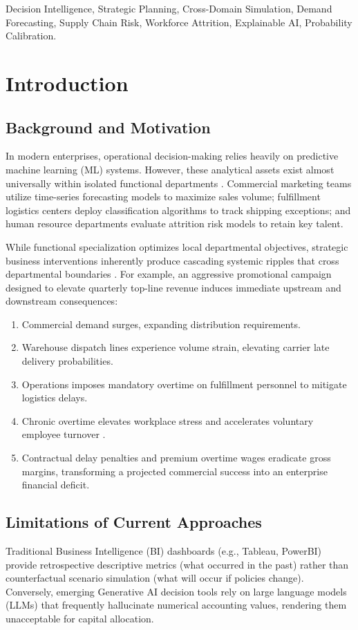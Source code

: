 \documentclass[10pt,conference]{IEEEtran}
\begin{document}
\begin{IEEEkeywords}
Decision Intelligence, Strategic Planning, Cross-Domain Simulation, Demand Forecasting, Supply Chain Risk, Workforce Attrition, Explainable AI, Probability Calibration.
\end{IEEEkeywords}

\section{Introduction}

\subsection{Background and Motivation}
In modern enterprises, operational decision-making relies heavily on predictive machine learning (ML) systems. However, these analytical assets exist almost universally within isolated functional departments \cite{pratt2019decision}. Commercial marketing teams utilize time-series forecasting models to maximize sales volume; fulfillment logistics centers deploy classification algorithms to track shipping exceptions; and human resource departments evaluate attrition risk models to retain key talent.

While functional specialization optimizes local departmental objectives, strategic business interventions inherently produce cascading systemic ripples that cross departmental boundaries \cite{lee1997bullwhip}. For example, an aggressive promotional campaign designed to elevate quarterly top-line revenue induces immediate upstream and downstream consequences:
\begin{enumerate}
    \item Commercial demand surges, expanding distribution requirements.
    \item Warehouse dispatch lines experience volume strain, elevating carrier late delivery probabilities.
    \item Operations imposes mandatory overtime on fulfillment personnel to mitigate logistics delays.
    \item Chronic overtime elevates workplace stress and accelerates voluntary employee turnover \cite{maslach2001burnout}.
    \item Contractual delay penalties and premium overtime wages eradicate gross margins, transforming a projected commercial success into an enterprise financial deficit.
\end{enumerate}

\subsection{Limitations of Current Approaches}
Traditional Business Intelligence (BI) dashboards (e.g., Tableau, PowerBI) provide retrospective descriptive metrics (what occurred in the past) rather than counterfactual scenario simulation (what will occur if policies change). Conversely, emerging Generative AI decision tools rely on large language models (LLMs) that frequently hallucinate numerical accounting values, rendering them unacceptable for capital allocation. 
\end{document}
